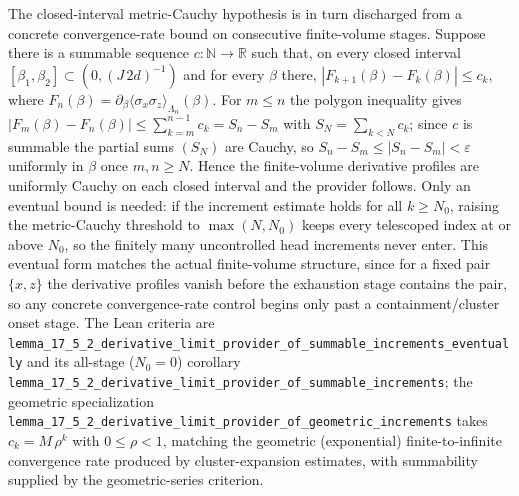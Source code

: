 \documentclass[a4paper,11pt]{article}
\begin{document}
The closed-interval metric-Cauchy hypothesis is in turn discharged from a
concrete convergence-rate bound on consecutive finite-volume stages.  Suppose
there is a summable sequence \(c:\mathbb{N}\to\mathbb{R}\) such that, on every
closed interval \([\beta_1,\beta_2]\subset(0,(J\,2d)^{-1})\) and for every
\(\beta\) there, \(|F_{k+1}(\beta)-F_k(\beta)|\le c_k\), where
\(F_n(\beta)=\partial_\beta\langle\sigma_x\sigma_z\rangle_{\Lambda_n}(\beta)\).
For \(m\le n\) the polygon inequality gives
\(|F_m(\beta)-F_n(\beta)|\le\sum_{k=m}^{n-1}c_k=S_n-S_m\) with
\(S_N=\sum_{k<N}c_k\); since \(c\) is summable the partial sums \((S_N)\) are
Cauchy, so \(S_n-S_m\le|S_n-S_m|<\varepsilon\) uniformly in \(\beta\) once
\(m,n\ge N\).  Hence the finite-volume derivative profiles are uniformly Cauchy
on each closed interval and the provider follows.  Only an eventual bound is
needed: if the increment estimate holds for all \(k\ge N_0\), raising the
metric-Cauchy threshold to \(\max(N,N_0)\) keeps every telescoped index at or
above \(N_0\), so the finitely many uncontrolled head increments never enter.
This eventual form matches the actual finite-volume structure, since for a fixed
pair \(\{x,z\}\) the derivative profiles vanish before the exhaustion stage
contains the pair, so any concrete convergence-rate control begins only past a
containment/cluster onset stage.  The Lean criteria are
\texttt{lemma\_17\_5\_2\_derivative\_limit\_provider\_of\_summable\_increments\_eventually}
and its all-stage (\(N_0=0\)) corollary
\texttt{lemma\_17\_5\_2\_derivative\_limit\_provider\_of\_summable\_increments};
the geometric specialization
\texttt{lemma\_17\_5\_2\_derivative\_limit\_provider\_of\_geometric\_increments}
takes \(c_k=M\,\rho^k\) with \(0\le\rho<1\), matching the
geometric (exponential) finite-to-infinite convergence rate produced by
cluster-expansion estimates, with summability supplied by the geometric-series
criterion.
\end{document}
